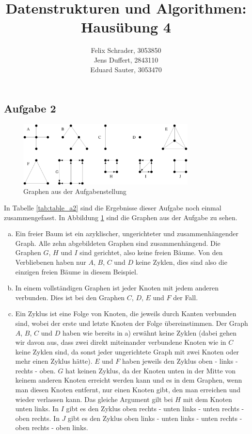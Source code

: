 \documentclass[11pt]{article}
\author{
  Felix Schrader, 3053850 \\ 
  Jens Duffert, 2843110 \\
  Eduard Sauter, 3053470
}
\title{Datenstrukturen und Algorithmen: Haus\"ubung 4}
\begin{document}
\maketitle
\subsection*{Aufgabe 2}
\begin{figure}[h!]
  \centering
  \includegraphics[width=0.8\textwidth]{a2_graphs.png}
  \caption{Graphen aus der Aufgabenstellung}
  \label{fig:a2_graphs}
\end{figure}
In Tabelle \ref{tab:table_a2} sind die Ergebnisse dieser Aufgabe noch einmal
zusammengefasst. In Abbildung \ref{fig:a2_graphs} sind die Graphen aus der Aufgabe zu
sehen.
\begin{enumerate}[a)]
  \item
    Ein freier Baum ist ein azyklischer, ungerichteter und zusammenhängender
    Graph. Alle zehn abgebildeten Graphen sind zusammenhängend. Die Graphen $G$,
    $H$ und $I$ sind gerichtet, also keine freien Bäume. Von den Verbliebenen
    haben nur $A$, $B$, $C$ und $D$ keine Zyklen, dies sind also die einzigen
    freien Bäume in diesem Beispiel.
  \item
    In einem vollständigen Graphen ist jeder Knoten mit jedem anderen verbunden.
    Dies ist bei den Graphen $C$, $D$, $E$ und $F$ der Fall.
  \item
    Ein Zyklus ist eine Folge von Knoten, die jeweils durch Kanten verbunden
    sind, wobei der erste und letzte Knoten der Folge übereinstimmen. Der Graph
    $A$, $B$, $C$ und $D$ haben wie bereits in a) erwähnt keine Zyklen (dabei
    gehen wir davon aus, dass zwei direkt miteinander verbundene Knoten wie in
    $C$ keine Zyklen sind, da sonst jeder ungerichtete Graph mit zwei Knoten
    oder mehr einen Zyklus hätte). $E$ und $F$ haben jeweils den Zyklus
    \textsf{oben - links - rechts - oben}. $G$ hat keinen Zyklus, da der Knoten
    unten in der Mitte von keinem anderen Knoten erreicht werden kann und es in
    dem Graphen, wenn man diesen Knoten entfernt, nur einen Knoten gibt, den man
    erreichen und wieder verlassen kann. Das gleiche Argument gilt bei $H$ mit
    dem Knoten unten links. In $I$ gibt es den Zyklus
    \textsf{oben rechts - unten links - unten rechts - oben rechts}. In $J$ gibt
    es den Zyklus
    \textsf{oben links - unten links - unten rechts - oben rechts - oben links}.
\end{enumerate}
\end{document}
